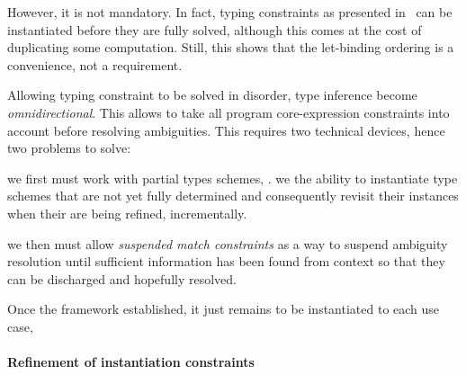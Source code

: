 \documentclass[acmsmall,screen,nonacm]{acmart}
\begin{document}
However, it is not mandatory.  In fact, typing constraints as presented
in~\cite {Pottier-Remy/emlti} can be instantiated before they are fully
solved, although this comes at the cost of duplicating some computation.
Still, this shows that the let-binding ordering is a convenience, not a
requirement.

Allowing typing constraint to be solved in disorder, type inference become
\emph{omnidirectional}.  This allows to take all program core-expression
constraints into account before resolving ambiguities.  This requires two
technical devices, hence two problems to solve:
\begin{enumerate*}
\item
  we first must work with partial types schemes, \ie. we the ability
  to instantiate type schemes that are not yet fully determined and
  consequently revisit their instances when their are being refined,
  incrementally.
\item
  we then must allow \emph{suspended match constraints} as a way to suspend
  ambiguity resolution until sufficient information has been found from
  context so that they can be discharged and hopefully resolved.

\end{enumerate*}
Once the framework established, it just remains to be instantiated
to each use case,


\paragraph {Refinement of instantiation constraints}
\end{document}
